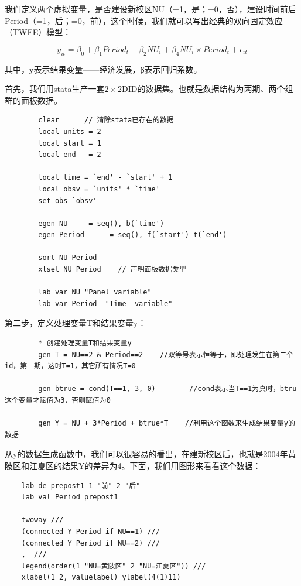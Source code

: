 \documentclass[cn,12pt,math=newtx,citestyle=gb7714-2015,bibstyle=gb7714-2015]{elegantbook}
\begin{document}
    我们定义两个虚拟变量，是否建设新校区NU（=1，是；=0，否），建设时间前后Period（=1，后；=0，前），这个时候，我们就可以写出经典的双向固定效应（TWFE）模型：
    
    \begin{equation}
    	y_{i t}=\beta_{0}+\beta_{1} P e r i o d_{t}+\beta_{2} N U_{i}+\beta_{4} N U_{i} \times P e r i o d_{t}+\epsilon_{i t}
    \end{equation}
    
    其中，y表示结果变量——经济发展，β表示回归系数。
    
    首先，我们用stata生产一套$2\times 2$DID的数据集。也就是数据结构为两期、两个组群的面板数据。
    
    \begin{lstlisting}
    	clear      // 清除stata已存在的数据
    	local units = 2
    	local start = 1
    	local end   = 2
    	
    	local time = `end' - `start' + 1
    	local obsv = `units' * `time'
    	set obs `obsv'
    	
    	egen NU     = seq(), b(`time')  
    	egen Period      = seq(), f(`start') t(`end')   
    	
    	sort NU Period
    	xtset NU Period    // 声明面板数据类型
    	
    	lab var NU "Panel variable"
    	lab var Period  "Time  variable"
    \end{lstlisting}
	
	第二步，定义处理变量T和结果变量y：
	
	\begin{lstlisting}
		* 创建处理变量T和结果变量y
		gen T = NU==2 & Period==2    //双等号表示恒等于，即处理发生在第二个id，第二期，这时T=1，其它所有情况T=0
		
		gen btrue = cond(T==1, 3, 0)        //cond表示当T==1为真时，btru这个变量才赋值为3，否则赋值为0
		
		gen Y = NU + 3*Period + btrue*T    //利用这个函数来生成结果变量y的数据
	\end{lstlisting}

    从y的数据生成函数中，我们可以很容易的看出，在建新校区后，也就是2004年黄陂区和江夏区的结果Y的差异为4。下面，我们用图形来看看这个数据：
	
	\begin{lstlisting}
	lab de prepost1 1 "前" 2 "后"
	lab val Period prepost1
	
	twoway ///
	(connected Y Period if NU==1) ///
	(connected Y Period if NU==2) ///
	,  ///
	legend(order(1 "NU=黄陂区" 2 "NU=江夏区")) ///
	xlabel(1 2, valuelabel) ylabel(4(1)11)
	
	\end{lstlisting}
	
\end{document}
